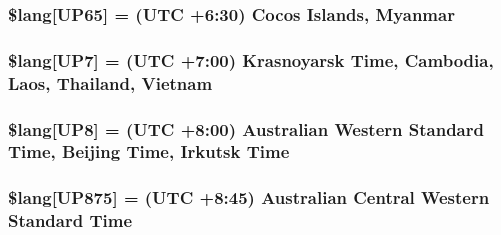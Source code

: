 \subsubsection[{\$lang}]{\setlength{\rightskip}{0pt plus 5cm}\$lang\mbox{[}\textquotesingle{}U\+P65\textquotesingle{}\mbox{]} = \textquotesingle{}(U\+T\+C +6\+:30) Cocos Islands, Myanmar\textquotesingle{}}\label{system_2language_2english_2date__lang_8php_af94f885b6e6c50abdf7672ddfa80774d}
\hypertarget{system_2language_2english_2date__lang_8php_aeedffaf1d3a16a41e881d85c420482ce}{}
\subsubsection[{\$lang}]{\setlength{\rightskip}{0pt plus 5cm}\$lang\mbox{[}\textquotesingle{}U\+P7\textquotesingle{}\mbox{]} = \textquotesingle{}(U\+T\+C +7\+:00) Krasnoyarsk Time, Cambodia, Laos, Thailand, Vietnam\textquotesingle{}}\label{system_2language_2english_2date__lang_8php_aeedffaf1d3a16a41e881d85c420482ce}
\hypertarget{system_2language_2english_2date__lang_8php_a2a828a680158ca4cfb7fba60f35c67a3}{}
\subsubsection[{\$lang}]{\setlength{\rightskip}{0pt plus 5cm}\$lang\mbox{[}\textquotesingle{}U\+P8\textquotesingle{}\mbox{]} = \textquotesingle{}(U\+T\+C +8\+:00) Australian Western Standard Time, Beijing Time, Irkutsk Time\textquotesingle{}}\label{system_2language_2english_2date__lang_8php_a2a828a680158ca4cfb7fba60f35c67a3}
\hypertarget{system_2language_2english_2date__lang_8php_a486696d3d41c5d263a8b550903052ecb}{}
\subsubsection[{\$lang}]{\setlength{\rightskip}{0pt plus 5cm}\$lang\mbox{[}\textquotesingle{}U\+P875\textquotesingle{}\mbox{]} = \textquotesingle{}(U\+T\+C +8\+:45) Australian Central Western Standard Time\textquotesingle{}}\label{system_2language_2english_2date__lang_8php_a486696d3d41c5d263a8b550903052ecb}
\hypertarget{system_2language_2english_2date__lang_8php_aa112bfd057369e5adb437c55457c9f79}{}
